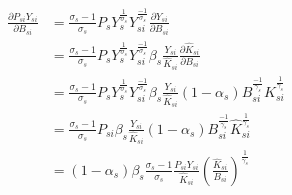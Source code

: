 
\begin{equation*}
    \begin{split}
        \frac{\partial P_{si}Y_{si} }{\partial B_{si}}  & = 
        \frac{\sigma_s-1}{\sigma_s}P_s{Y}_s^{\frac{1}{\sigma_s}}Y_{si}^{\frac{-1}{\sigma_s}}\frac{\partial Y_{si}}{\partial B_{si}}\\
        & = \frac{\sigma_s-1}{\sigma_s}P_s{Y}_s^{\frac{1}{\sigma_s}}Y_{si}^{\frac{-1}{\sigma_s}} \beta_s \frac{Y_{si}}{\hat{K}_{si}}\frac{\partial \hat{K}_{si}}{\partial B_{si}}\\
        & = \frac{\sigma_s-1}{\sigma_s}P_s{Y}_s^{\frac{1}{\sigma_s}}Y_{si}^{\frac{-1}{\sigma_s}} \beta_s \frac{Y_{si}}{\hat{K}_{si}}(1-\alpha_s) B_{si}^{\frac{-1}{\gamma_s}} \hat{K}_{si}^{\frac{1}{\gamma_s}}\\
        & = \frac{\sigma_s-1}{\sigma_s}P_{si} \beta_s \frac{Y_{si}}{\hat{K}_{si}}(1-\alpha_s) B_{si}^{\frac{-1}{\gamma_s}} \hat{K}_{si}^{\frac{1}{\gamma_s}}\\
        & = (1-\alpha_s) \beta_s  \frac{\sigma_s-1}{\sigma_s} \frac{P_{si}Y_{si}}{\hat{K}_{si}}(\frac{\hat{K}_{si}}{B_{si}})^{\frac{1}{\gamma_s}}
    \end{split}
\end{equation*}